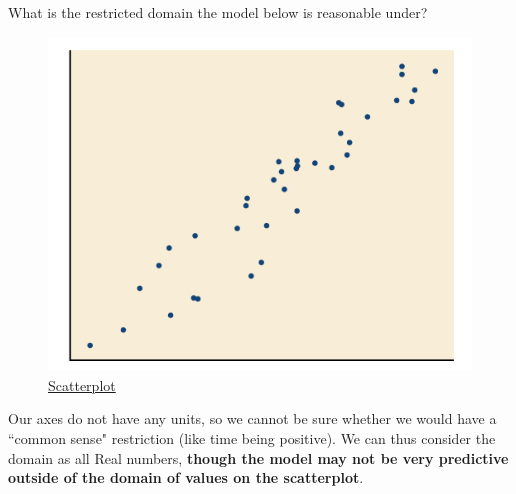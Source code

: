 \documentclass{ximera}
\begin{document}
\begin{question}
What is the restricted domain the model below is reasonable under?
\begin{figure}
\includegraphics[scale=0.4]{positiveR.png}
\caption{\href{https://cnx.org/contents/mwjClAV_@8.12:6dX4RGdg@12/Fitting-Linear-Models-to-Data}{Scatterplot}}
\end{figure}

\begin{multipleChoice}
\end{multipleChoice}

\begin{feedback}[correct]
Our axes do not have any units, so we cannot be sure whether we would have a ``common sense" restriction (like time being positive). We can thus consider the domain as all Real numbers, \textbf{though the model may not be very predictive outside of the domain of values on the scatterplot}.
\end{feedback}

\end{question}
\end{document}
